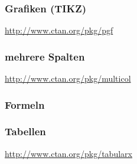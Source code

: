 \subsubsection{Grafiken (TIKZ)}
\url{http://www.ctan.org/pkg/pgf}

\subsubsection{mehrere Spalten}
\url{http://www.ctan.org/pkg/multicol}


\subsubsection{Formeln}
\subsubsection{Tabellen}
\url{http://www.ctan.org/pkg/tabularx}
